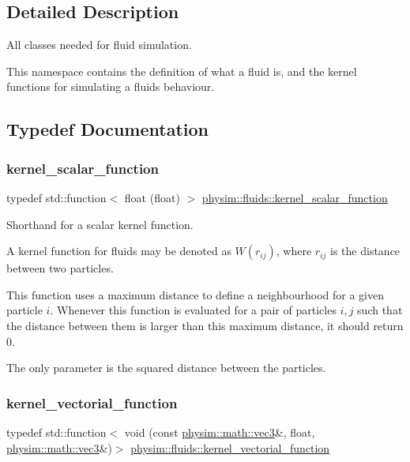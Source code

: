 \subsection{Detailed Description}
All classes needed for fluid simulation. 

This namespace contains the definition of what a fluid is, and the kernel functions for simulating a fluid\textquotesingle{}s behaviour. 

\subsection{Typedef Documentation}
\mbox{\label{namespacephysim_1_1fluids_a22c55c76ab3fe3de79dada15e2f9c2d6}} 
\subsubsection{\texorpdfstring{kernel\+\_\+scalar\+\_\+function}{kernel\_scalar\_function}}
{\footnotesize\ttfamily typedef std\+::function$<$ float (float) $>$ \hyperlink{namespacephysim_1_1fluids_a22c55c76ab3fe3de79dada15e2f9c2d6}{physim\+::fluids\+::kernel\+\_\+scalar\+\_\+function}}



Shorthand for a scalar kernel function. 

A kernel function for fluids may be denoted as $W(r_{ij})$, where $r_{ij}$ is the distance between two particles.

This function uses a maximum distance to define a neighbourhood for a given particle $i$. Whenever this function is evaluated for a pair of particles $i, j$ such that the distance between them is larger than this maximum distance, it should return 0.

The only parameter is the squared distance between the particles. \mbox{\label{namespacephysim_1_1fluids_ab109a55050c62abe9c1c23924f620754}} 
\subsubsection{\texorpdfstring{kernel\+\_\+vectorial\+\_\+function}{kernel\_vectorial\_function}}
{\footnotesize\ttfamily typedef std\+::function$<$ void (const \hyperlink{structphysim_1_1math_1_1vec3}{physim\+::math\+::vec3}\&, float, \hyperlink{structphysim_1_1math_1_1vec3}{physim\+::math\+::vec3}\&)$>$ \hyperlink{namespacephysim_1_1fluids_ab109a55050c62abe9c1c23924f620754}{physim\+::fluids\+::kernel\+\_\+vectorial\+\_\+function}}




